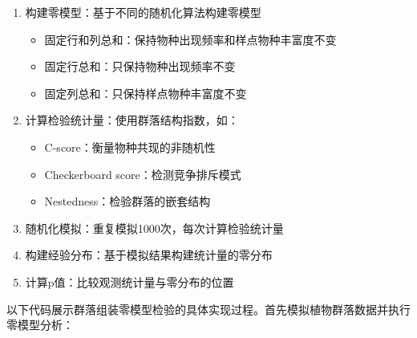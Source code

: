 \documentclass[
  twoside,12pt,fontset=none]{ctexbook}
\providecommand{\tightlist}{%
  \setlength{\itemsep}{0pt}\setlength{\parskip}{0pt}}
\begin{document}
\begin{enumerate}
\def\labelenumi{\arabic{enumi}.}
\item
  构建零模型：基于不同的随机化算法构建零模型

  \begin{itemize}
  \tightlist
  \item
    固定行和列总和：保持物种出现频率和样点物种丰富度不变
  \item
    固定行总和：只保持物种出现频率不变
  \item
    固定列总和：只保持样点物种丰富度不变
  \end{itemize}
\item
  计算检验统计量：使用群落结构指数，如：

  \begin{itemize}
  \tightlist
  \item
    C-score：衡量物种共现的非随机性
  \item
    Checkerboard score：检测竞争排斥模式
  \item
    Nestedness：检验群落的嵌套结构
  \end{itemize}
\item
  随机化模拟：重复模拟1000次，每次计算检验统计量
\item
  构建经验分布：基于模拟结果构建统计量的零分布
\item
  计算p值：比较观测统计量与零分布的位置
\end{enumerate}

以下代码展示群落组装零模型检验的具体实现过程。首先模拟植物群落数据并执行零模型分析：
\end{document}

